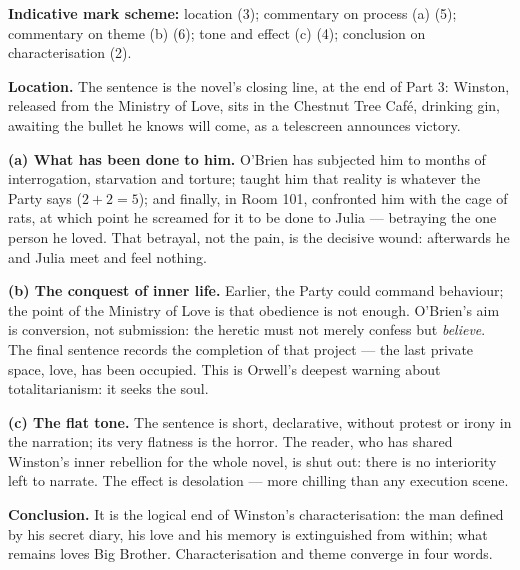 \documentclass[11pt]{article}
\begin{document}
\begin{corrige}
\textbf{Indicative mark scheme:} location (3); commentary on process (a) (5); commentary on theme (b) (6); tone and effect (c) (4); conclusion on characterisation (2).

\textbf{Location.} The sentence is the novel's closing line, at the end of Part 3: Winston, released from the Ministry of Love, sits in the Chestnut Tree Caf\'e, drinking gin, awaiting the bullet he knows will come, as a telescreen announces victory.

\textbf{(a) What has been done to him.} O'Brien has subjected him to months of interrogation, starvation and torture; taught him that reality is whatever the Party says ($2+2=5$); and finally, in Room 101, confronted him with the cage of rats, at which point he screamed for it to be done to Julia --- betraying the one person he loved. That betrayal, not the pain, is the decisive wound: afterwards he and Julia meet and feel nothing.

\textbf{(b) The conquest of inner life.} Earlier, the Party could command behaviour; the point of the Ministry of Love is that obedience is not enough. O'Brien's aim is conversion, not submission: the heretic must not merely confess but \emph{believe}. The final sentence records the completion of that project --- the last private space, love, has been occupied. This is Orwell's deepest warning about totalitarianism: it seeks the soul.

\textbf{(c) The flat tone.} The sentence is short, declarative, without protest or irony in the narration; its very flatness is the horror. The reader, who has shared Winston's inner rebellion for the whole novel, is shut out: there is no interiority left to narrate. The effect is desolation --- more chilling than any execution scene.

\textbf{Conclusion.} It is the logical end of Winston's characterisation: the man defined by his secret diary, his love and his memory is extinguished from within; what remains loves Big Brother. Characterisation and theme converge in four words.
\end{corrige}
\end{document}
